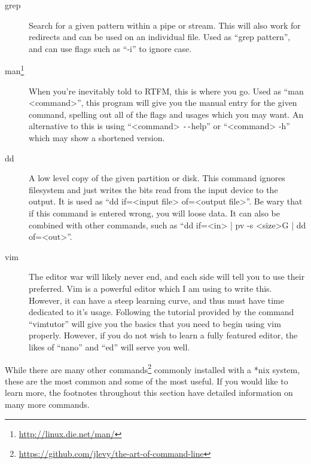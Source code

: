 \documentclass[a4paper,11pt]{report}
\begin{document}
\begin{description}
			\item[grep]
				Search for a given pattern within a pipe or stream. 
				This will also work for redirects and can be used on an individual file. 
				Used as ``grep pattern'', and can use flags such as ``-i'' to ignore case. 
			\item[man\footnote{\url{http://linux.die.net/man/}}]
				When you're inevitably told to RTFM, this is where you go. 
				Used as ``man <command>'', this program will give you the manual entry for the given command, spelling out all of the flags and usages which you may want. 
				An alternative to this is using ``<command> \verb+--+help'' or ``<command> -h'' which may show a shortened version. 
			\item[dd]
				A low level copy of the given partition or disk. 
				This command ignores filesystem and just writes the bits read from the input device to the output. 
				It is used as ``dd if=<input file> of=<output file>''.
				Be wary that if this command is entered wrong, you will loose data. 
				It can also be combined with other commands, such as ``dd if=<in> | pv -s <size>G | dd of=<out>''.
			\item[vim]
				The editor war will likely never end, and each side will tell you to use their preferred. 
				Vim is a powerful editor which I am using to write this. 
				However, it can have a steep learning curve, and thus must have time dedicated to it's usage. 
				Following the tutorial provided by the command ``vimtutor'' will give you the basics that you need to begin using vim properly. 
				However, if you do not wish to learn a fully featured editor, the likes of ``nano'' and ``ed'' will serve you well. 
		\end{description}
		While there are many other commands\footnote{\url{https://github.com/jlevy/the-art-of-command-line}} commonly installed with a \**nix system, these are the most common and some of the most useful. If you would like to learn more, the footnotes throughout this section have detailed information on many more commands. 
\end{document}
